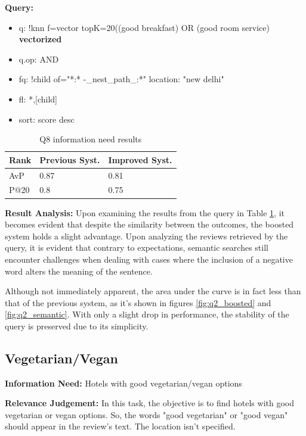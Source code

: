 \documentclass[sigconf]{acmart}
\begin{document}
\textbf{Query:}

\begin{itemize}
    \item q: {!knn f=vector topK=20}((good breakfast) OR (good room service) \textbf{vectorized}
    \item q.op: AND
    \item fq: {!child of="*:* -\_nest\_path\_:*"} location: "new delhi"
    \item fl: *,[child]
    \item sort: score desc
\end{itemize}

\begin{table}[H]
\caption{Q8 information need results}
\label{tab:q8}
\begin{tabular}{lll}
\toprule
Rank & Previous Syst. & Improved Syst.\\
\midrule
AvP & 0.87 & 0.81  \\
P@20 & 0.8 & 0.75 \\
\bottomrule
\end{tabular}
\end{table}

\textbf{Result Analysis:} Upon examining the results from the query in Table \ref{tab:q8}, it becomes evident that despite the similarity between the outcomes, the boosted system holds a slight advantage.
Upon analyzing the reviews retrieved by the query, it is evident that contrary to expectations, semantic searches still encounter challenges when dealing with cases where the inclusion of a negative word alters the meaning of the sentence.

Although not immediately apparent, the area under the curve is in fact less than that of the previous system, as it's shown in figures \ref{fig:q2_boosted} and \ref{fig:q2_semantic}. With only a slight drop in performance, the stability of the query is preserved due to its simplicity.

\subsection{Vegetarian/Vegan}

\textbf{Information Need:} Hotels with good vegetarian/vegan options

\textbf{Relevance Judgement:} In this task, the objective is to find hotels with good vegetarian or vegan options. So, the words "good vegetarian" or "good vegan" should appear in the review's text. The location isn't specified.
\end{document}
